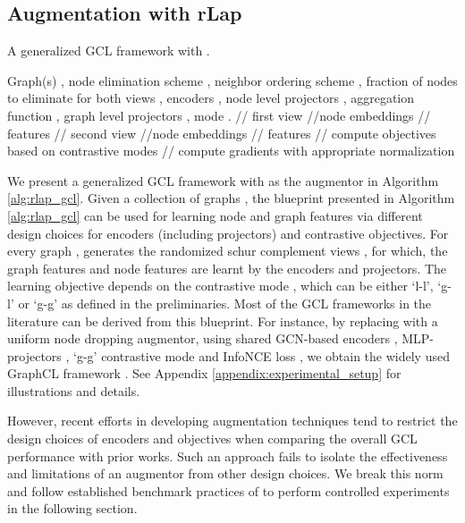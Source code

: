\documentclass{article}
\theoremstyle{plain}
\theoremstyle{definition}
\theoremstyle{remark}
\begin{document}
\subsection{Augmentation with rLap}

\begin{algorithm}[tb]
  \caption{A generalized GCL framework with .}
  \label{alg:rlap_gcl}
\begin{algorithmic}
   Graph(s)  , node elimination scheme , neighbor ordering scheme , fraction of nodes to eliminate for both views , encoders , node level projectors , aggregation function , graph level projectors ,  mode .
  \REPEAT
  \STATE  \hfill // first view
  \STATE  \hfill //node embeddings
  \STATE  \hfill // features
  \STATE  \hfill // second view
  \STATE  \hfill //node embeddings
  \STATE  \hfill // features
  \ENDFOR
  \STATE // compute objectives based on contrastive modes
  \STATE 
  \IF{}
   \STATE   
   \ELSIF{} 
   \STATE   
   \ELSIF{} 
   \STATE   
   \ENDIF
  \ENDFOR
  \STATE // compute gradients with appropriate normalization 
  \STATE 
\end{algorithmic}
\end{algorithm}

We present a generalized GCL framework with  as the augmentor in Algorithm \ref{alg:rlap_gcl}. Given a collection of graphs , the blueprint presented in Algorithm \ref{alg:rlap_gcl} can be used for learning node and graph features via different design choices for encoders (including projectors) and contrastive objectives. For every graph ,  generates the randomized schur complement views , for which, the graph features  and node features  are learnt by the encoders and projectors. The learning objective depends on the contrastive mode , which can be either `l-l', `g-l' or `g-g' as defined in the preliminaries. Most of the GCL frameworks in the literature can be derived from this blueprint. For instance, by replacing  with a uniform node dropping augmentor, using shared GCN-based encoders , MLP-projectors , `g-g' contrastive mode and InfoNCE loss , we obtain the widely used GraphCL framework \citep{you2020graph}. See Appendix \ref{appendix:experimental_setup} for illustrations and details.

However, recent efforts in developing augmentation techniques tend to restrict the design choices of encoders and objectives when comparing the overall GCL performance with prior works. Such an approach fails to isolate the effectiveness and limitations of an augmentor from other design choices. We break this norm and follow established benchmark practices of \citet{zhu2021empirical} to perform controlled experiments in the following section.
\end{document}
